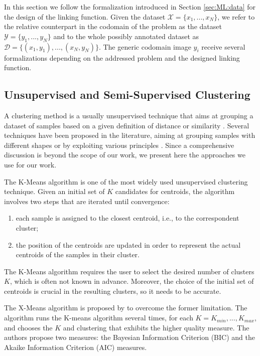 In this section we follow the formalization introduced in Section \ref{sec:ML:data} for the design of the linking function. Given the dataset $\mathcal{X}=\{x_1,...,x_N\}$, we refer to the relative counterpart in the codomain of the problem as the dataset $\mathcal{Y}=\{y_1,...,y_N\}$ and to the whole possibly annotated dataset as $\mathcal{D}=\{(x_1, y_1),...,(x_N, y_N)\}$. The generic codomain image $y_i$ receive several formalizations depending on the addressed problem and the designed linking function. %


\subsection{Unsupervised and Semi-Supervised Clustering}\label{sec:ML:clust}
A clustering method is a usually unsupervised technique that aims at grouping a dataset of samples based on a given definition of distance or similarity \cite{PAMI}. Several techniques have been proposed in the literature, aiming at grouping samples with different shapes or by exploiting various principles \cite{jain1999data}. Since a comprehensive discussion is beyond the scope of our work, we present here the approaches we use for our work.

The K-Means \cite{macqueen1967some} algorithm is one of the most widely used unsupervised clustering technique. Given an initial set of $K$ candidates for centroids, the algorithm involves two steps that are iterated until convergence: 
\begin{enumerate}
	\item each sample is assigned to the closest centroid, i.e., to the correspondent cluster;
	\item the position of the centroids are updated in order to represent the actual centroids of the samples in their cluster.
\end{enumerate}
The K-Means algorithm requires the user to select the desired number of clusters $K$, which is often not known in advance.  Moreover, the choice of the initial set of centroids is crucial in the resulting clusters, so it needs to be accurate. 

The X-Means algorithm is proposed by \cite{Pelleg2000} to overcome the former limitation. The algorithm runs the K-means algorithm several times, for each $K=K_{min},...,K_{max}$, and chooses the $K$ and clustering that exhibits the higher quality measure. The authors propose two measures: the Bayesian Information Criterion (BIC) and the Akaike Information Criterion (AIC) measures.

